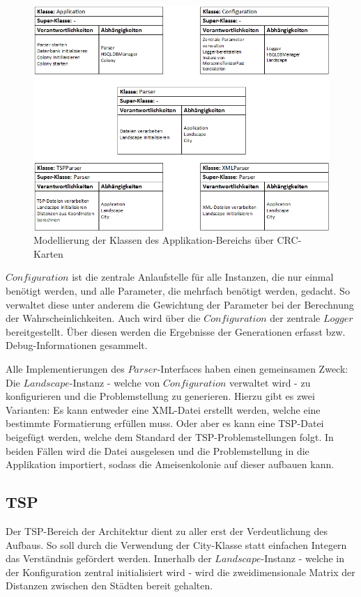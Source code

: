 \begin{figure}[H]
	\centering
	\includegraphics[width=0.8\linewidth]{images/CRC_applikation.png}
	\caption{Modellierung der Klassen des Applikation-Bereichs über CRC-Karten}
	\label{crcApplikation}
\end{figure}

\newpage
$Configuration$ ist die zentrale Anlaufstelle für alle Instanzen, die nur einmal benötigt werden, und alle Parameter, die mehrfach benötigt werden, gedacht. So verwaltet diese unter anderem die Gewichtung der Parameter bei der Berechnung der Wahrscheinlichkeiten. Auch wird über die $Configuration$ der zentrale $Logger$ bereitgestellt. Über diesen werden die Ergebnisse der Generationen erfasst bzw. Debug-Informationen gesammelt.

Alle Implementierungen des $Parser$-Interfaces haben einen gemeinsamen Zweck: Die $Landscape$-Instanz - welche von $Configuration$ verwaltet wird - zu konfigurieren und die Problemstellung zu generieren. Hierzu gibt es zwei Varianten: Es kann entweder eine XML-Datei erstellt werden, welche eine bestimmte Formatierung erfüllen muss. Oder aber es kann eine \ac{TSP}-Datei beigefügt werden, welche dem Standard der \ac{TSP}-Problemstellungen folgt. In beiden Fällen wird die Datei ausgelesen und die Problemstellung in die Applikation importiert, sodass die Ameisenkolonie auf dieser aufbauen kann.

\subsection{TSP}
Der \ac{TSP}-Bereich der Architektur dient zu aller erst der Verdeutlichung des Aufbaus. So soll durch die Verwendung der City-Klasse statt einfachen Integern das Verständnis gefördert werden. Innerhalb der $Landscape$-Instanz - welche in der Konfiguration zentral initialisiert wird -  wird die zweidimensionale Matrix der Distanzen zwischen den Städten bereit gehalten. 

